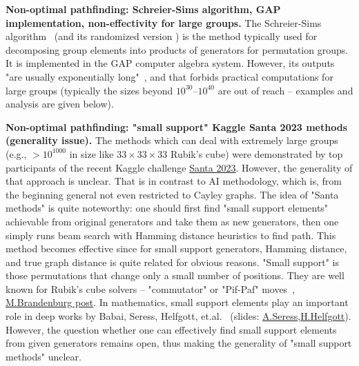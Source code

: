\documentclass[reqno,11pt]{amsart}
\begin{document}
{\bf Non-optimal pathfinding: Schreier-Sims algorithm, GAP implementation, non-effectivity for large groups.} 
The Schreier-Sims algorithm~\cite{sims1970computational} (and its randomized version \cite{knuth1991efficient}) is the method typically used for decomposing group elements into products of generators for permutation groups. It is implemented in the GAP computer algebra system. However, its outputs "are usually exponentially long"~\cite{fiat1989planning}, and that forbids practical computations for large groups (typically the sizes beyond $10^{30}$--$10^{40}$ are out of reach -- examples and analysis are given below). 


{\bf Non-optimal pathfinding: "small support" Kaggle Santa 2023 methods (generality issue).} The methods which can deal with extremely large groups (e.g., $>10^{1000}$ in size like $33\times33\times33$ Rubik's cube) were demonstrated by top participants of the recent Kaggle challenge \href{https://www.kaggle.com/competitions/santa-2023}{Santa 2023}. However, the generality of that approach is unclear.
That is in contrast to AI methodology, which is, from the beginning general not even restricted to Cayley graphs. The idea of "Santa methods" is quite noteworthy: one should first find "small support elements" achievable from original generators and take them as new generators, then one simply runs beam search with Hamming distance heuristics to find path. This method becomes effective since for small support generators, Hamming distance, and true graph distance is quite related for obvious reasons. "Small support" is those permutations that change only a small number of positions. They are well known for Rubik's cube solvers -- "commutator" or "Pif-Paf" moves~\cite{mulholland2016permutation}, \href{https://math.stackexchange.com/q/4962862/21498}{M.Brandenburg post}. In mathematics, small support elements play an important role in deep works by Babai, Seress, Helfgott, et.al.~\cite{babai1988diameter, babai2004diameter, bamberg2014bounds, helfgott2014diameter, helfgott2019growth} (slides: \href{https://www.math.auckland.ac.nz/~conder/SODO-2012/Seress-SODO2012.pdf}{A.Seress},\href{https://simons.berkeley.edu/sites/default/files/docs/6206/symtalk.pdf}{H.Helfgott}). However, the question whether one can effectively find small support elements from given generators remains open, thus making the generality of "small support methods" unclear.
\end{document}
